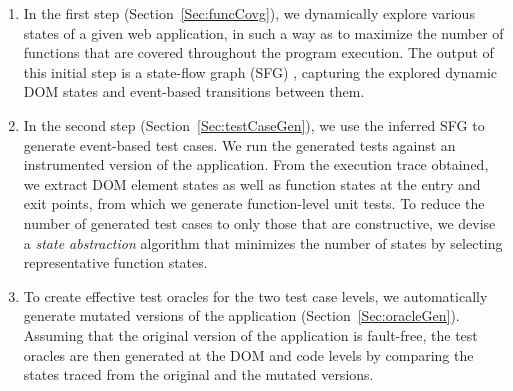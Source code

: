 \begin{enumerate}
 
\item In the first step (Section~\ref{Sec:funcCovg}), we dynamically explore various states of a given web 
application, in such a way as to maximize the number of functions that are covered throughout the program execution. The output of this initial step is a state-flow graph (SFG) \cite{mesbah:tse12}, capturing the explored dynamic DOM states and event-based transitions between them. 

\item In the second step (Section~\ref{Sec:testCaseGen}), %
we use the inferred SFG to generate event-based test cases. %
We run the generated tests against an instrumented version of the application. From the execution trace obtained, we extract DOM element states as well as \javascript function states at the entry and exit points, from which we generate function-level unit tests.
To reduce the number of generated test cases to only those that are constructive, we devise a \emph{state abstraction} algorithm that minimizes the number of states by selecting representative function states.

\item To create effective test oracles for the two test case levels, we automatically generate mutated versions of the application (Section~\ref{Sec:oracleGen}).
Assuming that the original version of the application is fault-free, the test oracles are then generated at the DOM and \javascript code levels by comparing the states traced from the original and the mutated versions.

\end{enumerate}




  

   
